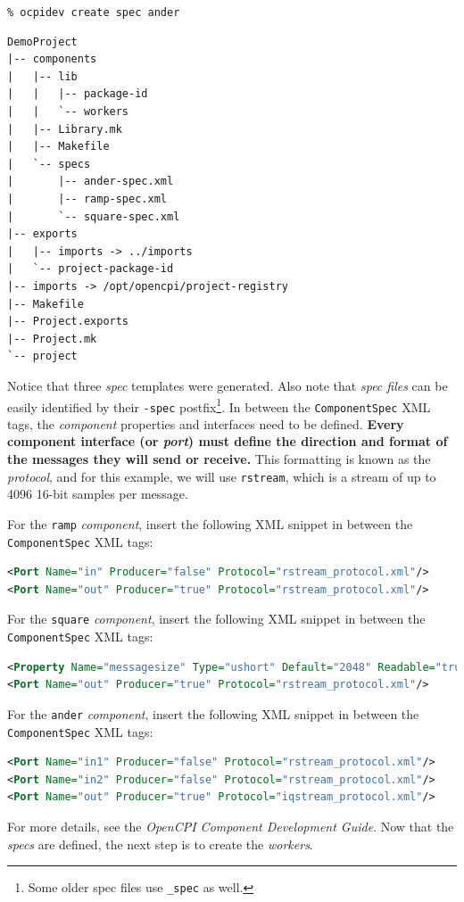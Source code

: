 \forceindent\verb+% ocpidev create spec ander+\\
\bstart
\begin{verbatim}
DemoProject
|-- components
|   |-- lib
|   |   |-- package-id
|   |   `-- workers
|   |-- Library.mk
|   |-- Makefile
|   `-- specs
|       |-- ander-spec.xml
|       |-- ramp-spec.xml
|       `-- square-spec.xml
|-- exports
|   |-- imports -> ../imports
|   `-- project-package-id
|-- imports -> /opt/opencpi/project-registry
|-- Makefile
|-- Project.exports
|-- Project.mk
`-- project
\end{verbatim}
\bend
Notice that three \textit{spec} templates were generated. Also note that \textit{spec files} can be easily identified by their \verb+-spec+ postfix\footnote{Some older spec files use \texttt{\_spec} as well.}. In between the \verb+ComponentSpec+ XML tags, the \textit{component} properties and interfaces need to be defined. \textbf{Every component interface (or \textit{port}) must define the direction and format of the messages they will send or receive.} This formatting is known as the \textit{protocol}, and for this example, we will use \texttt{rstream}, which is a stream of up to 4096 16-bit samples per message.

\bstart
For the \verb+ramp+ \textit{component}, insert the following XML snippet in between the \verb+ComponentSpec+ XML tags:

\begin{lstlisting}[language=xml]
<Port Name="in" Producer="false" Protocol="rstream_protocol.xml"/>
<Port Name="out" Producer="true" Protocol="rstream_protocol.xml"/>
\end{lstlisting}
\bend
\bstart
For the \verb+square+ \textit{component}, insert the following XML snippet in between the \verb+ComponentSpec+ XML tags:

\begin{lstlisting}[language=xml]
<Property Name="messagesize" Type="ushort" Default="2048" Readable="true" Writable="true"/>
<Port Name="out" Producer="true" Protocol="rstream_protocol.xml"/>
\end{lstlisting}
\bend
\bstart
For the \verb+ander+ \textit{component}, insert the following XML snippet in between the \verb+ComponentSpec+ XML tags:

\begin{lstlisting}[language=xml]
<Port Name="in1" Producer="false" Protocol="rstream_protocol.xml"/>
<Port Name="in2" Producer="false" Protocol="rstream_protocol.xml"/>
<Port Name="out" Producer="true" Protocol="iqstream_protocol.xml"/>
\end{lstlisting}
\bend
For more details, see the \textit{OpenCPI Component Development Guide}. Now that the \textit{specs} are defined, the next step is to create the \textit{workers}.

